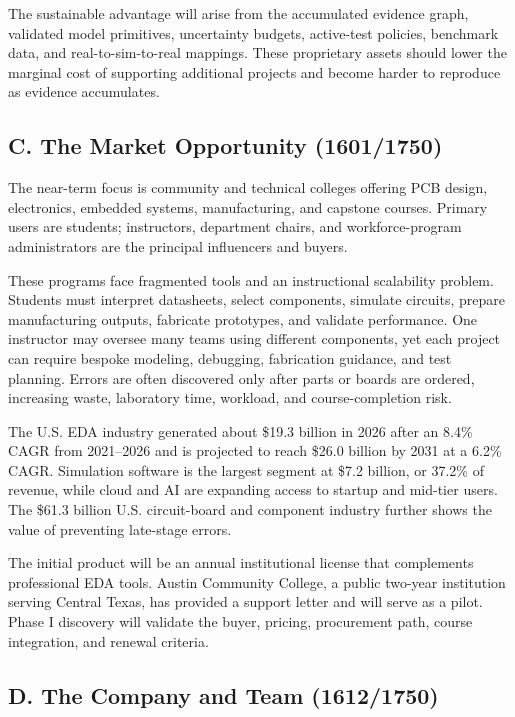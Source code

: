 \documentclass[12pt,letterpaper]{article}
\begin{document}
The sustainable advantage will arise from the accumulated evidence graph, validated model primitives, uncertainty budgets, active-test policies, benchmark data, and real-to-sim-to-real mappings. 
These proprietary assets should lower the marginal cost of supporting additional projects and become harder to reproduce as evidence accumulates.

\subsection{C. The Market Opportunity (1601/1750)}

The near-term focus is community and technical colleges offering PCB design, electronics, embedded systems, manufacturing, and capstone courses. 
Primary users are students; instructors, department chairs, and workforce-program administrators are the principal influencers and buyers.

These programs face fragmented tools and an instructional scalability problem. 
Students must interpret datasheets, select components, simulate circuits, prepare manufacturing outputs, fabricate prototypes, and validate performance. 
One instructor may oversee many teams using different components, yet each project can require bespoke modeling, debugging, fabrication guidance, and test planning. 
Errors are often discovered only after parts or boards are ordered, increasing waste, laboratory time, workload, and course-completion risk.

The U.S. EDA industry generated about \$19.3 billion in 2026 after an 8.4\% CAGR from 2021--2026 and is projected to reach \$26.0 billion by 2031 at a 6.2\% CAGR. Simulation software is the largest segment at \$7.2 billion, or 37.2\% of revenue, while cloud and AI are expanding access to startup and mid-tier users. 
The \$61.3 billion U.S. circuit-board and component industry further shows the value of preventing late-stage errors. 

The initial product will be an annual institutional license that complements professional EDA tools. Austin Community College, a public two-year institution serving Central Texas, has provided a support letter and will serve as a pilot. Phase I discovery will validate the buyer, pricing, procurement path, course integration, and renewal criteria.



\subsection{D. The Company and Team (1612/1750)}
\end{document}
